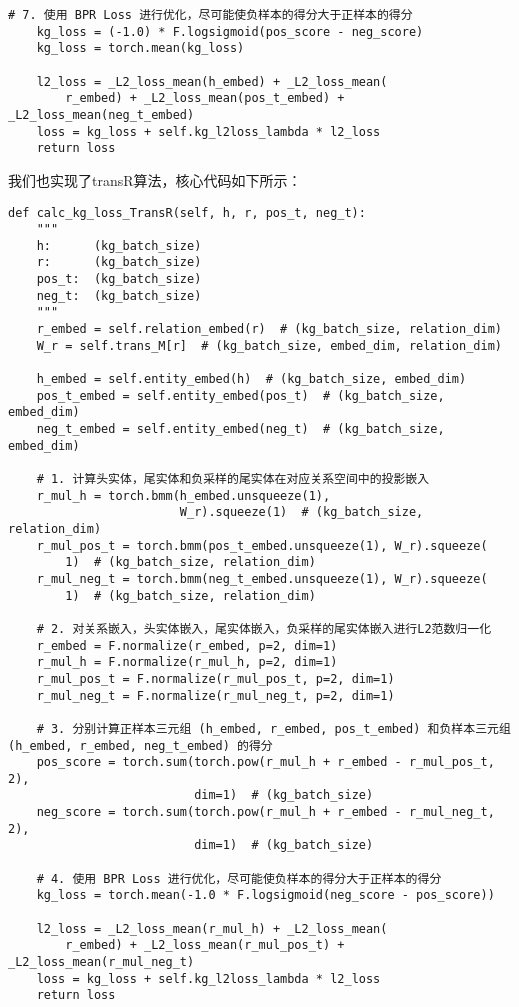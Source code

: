 \documentclass{ctexart}
\begin{document}
\begin{sloppypar}
\begin{lstlisting}[style=python]
    # 7. 使用 BPR Loss 进行优化，尽可能使负样本的得分大于正样本的得分
    kg_loss = (-1.0) * F.logsigmoid(pos_score - neg_score)
    kg_loss = torch.mean(kg_loss)

    l2_loss = _L2_loss_mean(h_embed) + _L2_loss_mean(
        r_embed) + _L2_loss_mean(pos_t_embed) + _L2_loss_mean(neg_t_embed)
    loss = kg_loss + self.kg_l2loss_lambda * l2_loss
    return loss
    \end{lstlisting}
    我们也实现了transR算法，核心代码如下所示：
\begin{lstlisting}[style=python]
def calc_kg_loss_TransR(self, h, r, pos_t, neg_t):
    """
    h:      (kg_batch_size)
    r:      (kg_batch_size)
    pos_t:  (kg_batch_size)
    neg_t:  (kg_batch_size)
    """
    r_embed = self.relation_embed(r)  # (kg_batch_size, relation_dim)
    W_r = self.trans_M[r]  # (kg_batch_size, embed_dim, relation_dim)

    h_embed = self.entity_embed(h)  # (kg_batch_size, embed_dim)
    pos_t_embed = self.entity_embed(pos_t)  # (kg_batch_size, embed_dim)
    neg_t_embed = self.entity_embed(neg_t)  # (kg_batch_size, embed_dim)

    # 1. 计算头实体，尾实体和负采样的尾实体在对应关系空间中的投影嵌入
    r_mul_h = torch.bmm(h_embed.unsqueeze(1),
                        W_r).squeeze(1)  # (kg_batch_size, relation_dim)
    r_mul_pos_t = torch.bmm(pos_t_embed.unsqueeze(1), W_r).squeeze(
        1)  # (kg_batch_size, relation_dim)
    r_mul_neg_t = torch.bmm(neg_t_embed.unsqueeze(1), W_r).squeeze(
        1)  # (kg_batch_size, relation_dim)

    # 2. 对关系嵌入，头实体嵌入，尾实体嵌入，负采样的尾实体嵌入进行L2范数归一化
    r_embed = F.normalize(r_embed, p=2, dim=1)
    r_mul_h = F.normalize(r_mul_h, p=2, dim=1)
    r_mul_pos_t = F.normalize(r_mul_pos_t, p=2, dim=1)
    r_mul_neg_t = F.normalize(r_mul_neg_t, p=2, dim=1)

    # 3. 分别计算正样本三元组 (h_embed, r_embed, pos_t_embed) 和负样本三元组 (h_embed, r_embed, neg_t_embed) 的得分
    pos_score = torch.sum(torch.pow(r_mul_h + r_embed - r_mul_pos_t, 2),
                          dim=1)  # (kg_batch_size)
    neg_score = torch.sum(torch.pow(r_mul_h + r_embed - r_mul_neg_t, 2),
                          dim=1)  # (kg_batch_size)

    # 4. 使用 BPR Loss 进行优化，尽可能使负样本的得分大于正样本的得分
    kg_loss = torch.mean(-1.0 * F.logsigmoid(neg_score - pos_score))

    l2_loss = _L2_loss_mean(r_mul_h) + _L2_loss_mean(
        r_embed) + _L2_loss_mean(r_mul_pos_t) + _L2_loss_mean(r_mul_neg_t)
    loss = kg_loss + self.kg_l2loss_lambda * l2_loss
    return loss
\end{lstlisting}


\end{sloppypar}
\end{document}
